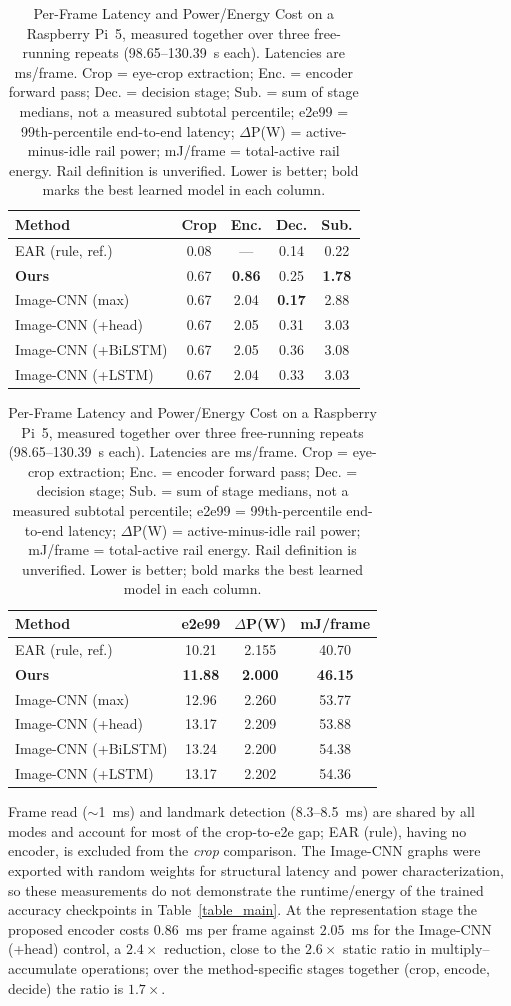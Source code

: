 \documentclass{IEEEmce}
\begin{document}
\begin{table}[!t]
\caption{Per-Frame Latency and Power/Energy Cost on a Raspberry Pi~5, measured together
over three free-running repeats (98.65--130.39~s each). Latencies are ms/frame. Crop = eye-crop extraction; Enc. = encoder
forward pass; Dec. = decision stage; Sub. = sum of stage medians, not a measured subtotal percentile; e2e99 = 99th-percentile
end-to-end latency; $\Delta$P(W) = active-minus-idle rail power; mJ/frame = total-active
rail energy. Rail definition is unverified. Lower is better; bold
marks the best learned model in each column.}
\label{table_edge}
\centering
\normalsize
\renewcommand{\arraystretch}{0.9}
\setlength{\tabcolsep}{3pt}
\begin{tabular*}{\columnwidth}{@{}l@{\extracolsep{\fill}}cccc@{}}
\hline\hline
Method & Crop & Enc. & Dec. & Sub.\\
\hline
EAR (rule, ref.)    & 0.08 & ---  & 0.14 & 0.22\\
\textbf{Ours}       & 0.67 & \textbf{0.86} & 0.25 & \textbf{1.78}\\
Image-CNN (max)     & 0.67 & 2.04 & \textbf{0.17} & 2.88\\
Image-CNN (+head)   & 0.67 & 2.05 & 0.31 & 3.03\\
Image-CNN (+BiLSTM) & 0.67 & 2.05 & 0.36 & 3.08\\
Image-CNN (+LSTM)   & 0.67 & 2.04 & 0.33 & 3.03\\
\hline\hline
\end{tabular*}
\vspace{3pt}

\begin{tabular*}{\columnwidth}{@{}l@{\extracolsep{\fill}}ccc@{}}
\hline\hline
Method & e2e99 & $\Delta$P(W) & mJ/frame\\
\hline
EAR (rule, ref.)    & 10.21 & 2.155 & 40.70\\
\textbf{Ours}       & \textbf{11.88} & \textbf{2.000} & \textbf{46.15}\\
Image-CNN (max)     & 12.96 & 2.260 & 53.77\\
Image-CNN (+head)   & 13.17 & 2.209 & 53.88\\
Image-CNN (+BiLSTM) & 13.24 & 2.200 & 54.38\\
Image-CNN (+LSTM)   & 13.17 & 2.202 & 54.36\\
\hline\hline
\end{tabular*}
\end{table}

Frame read ($\sim$1~ms) and landmark detection (8.3--8.5~ms) are shared by all modes and
account for most of the crop-to-e2e gap; EAR (rule), having no encoder, is excluded from
the \emph{crop} comparison. The Image-CNN graphs were exported with random weights for
structural latency and power characterization, so these measurements do not demonstrate
the runtime/energy of the trained accuracy checkpoints in
Table~\ref{table_main}. At the representation stage the proposed encoder costs $0.86$~ms
per frame against $2.05$~ms for the Image-CNN (+head) control, a $2.4\times$ reduction,
close to the $2.6\times$ static ratio in multiply--accumulate operations; over the
method-specific stages together (crop, encode, decide) the ratio is $1.7\times$.
\end{document}
